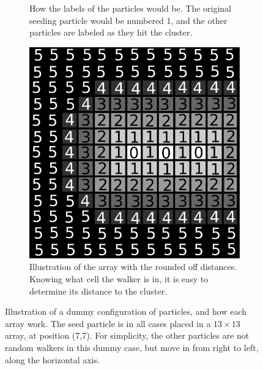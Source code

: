 \begin{figure}[h]
\begin{center}
\begin{subfigure}[t]{0.3\textwidth}
			\caption{How the labels of the particles would be. The original seeding particle would be numbered 1, and the other particles are labeled as they hit the cluster.}
			\label{fig:B_array}
		\end{subfigure}
		\begin{subfigure}[t]{0.3\textwidth}
			\includegraphics[width = \textwidth]{fig/C_array.png}
			\caption{Illustration of the array with the rounded off distances. Knowing what cell the walker is in, it is easy to determine its distance to the cluster.}
			\label{fig:C_array}
		\end{subfigure}
		\caption{Illustration of a dummy configuration of particles, and how each array work. The seed particle is in all cases placed in a $13 \times 13$ array, at position (7,7). For simplicity, the other particles are not random walkers in this dummy case, but move in from right to left, along the horizontal axis.}
		\label{fig:on_lattice_arrays}
	\end{center}
\end{figure}

